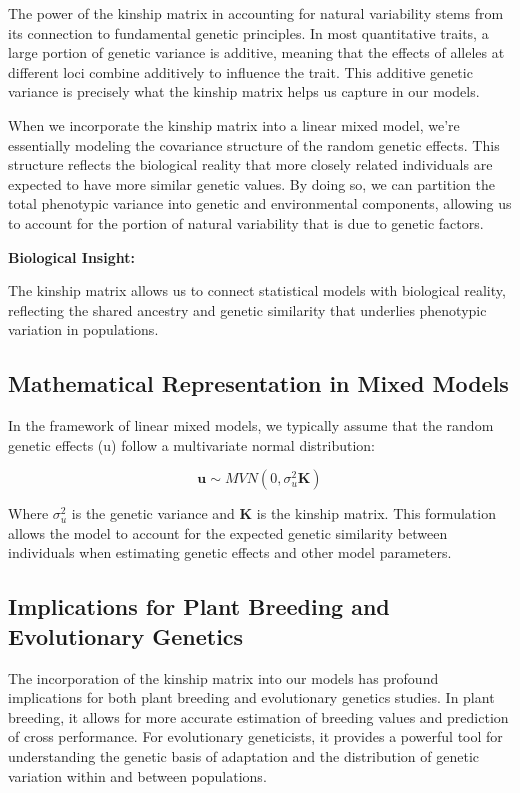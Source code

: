 \documentclass[12pt,a4paper]{article}
\newenvironment{biologicalinsightbox}[1][]
{\begin{basebox}[linecolor=uqpurple]
\textbf{\color{uqpurple}Biological Insight:} \textit{#1}\par\noindent\ignorespaces}
{\end{basebox}}
\begin{document}
The power of the kinship matrix in accounting for natural variability stems from its connection to fundamental genetic principles. In most quantitative traits, a large portion of genetic variance is additive, meaning that the effects of alleles at different loci combine additively to influence the trait. This additive genetic variance is precisely what the kinship matrix helps us capture in our models.

When we incorporate the kinship matrix into a linear mixed model, we're essentially modeling the covariance structure of the random genetic effects. This structure reflects the biological reality that more closely related individuals are expected to have more similar genetic values. By doing so, we can partition the total phenotypic variance into genetic and environmental components, allowing us to account for the portion of natural variability that is due to genetic factors.

\begin{biologicalinsightbox}
    
The kinship matrix allows us to connect statistical models with biological reality, reflecting the shared ancestry and genetic similarity that underlies phenotypic variation in populations.
\end{biologicalinsightbox}

\subsection{Mathematical Representation in Mixed Models}

In the framework of linear mixed models, we typically assume that the random genetic effects (u) follow a multivariate normal distribution:

\[
\mathbf{u} \sim MVN(0, \sigma^2_u\mathbf{K})
\]

Where $\sigma^2_u$ is the genetic variance and $\mathbf{K}$ is the kinship matrix. This formulation allows the model to account for the expected genetic similarity between individuals when estimating genetic effects and other model parameters.

\subsection{Implications for Plant Breeding and Evolutionary Genetics}

The incorporation of the kinship matrix into our models has profound implications for both plant breeding and evolutionary genetics studies. In plant breeding, it allows for more accurate estimation of breeding values and prediction of cross performance. For evolutionary geneticists, it provides a powerful tool for understanding the genetic basis of adaptation and the distribution of genetic variation within and between populations.
\end{document}
